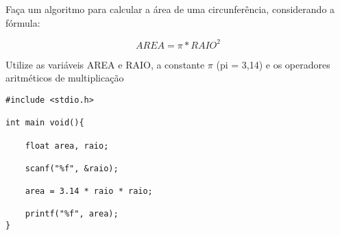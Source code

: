 
Faça um algoritmo para calcular a área de uma circunferência, considerando a fórmula:

\begin{equation}
	AREA = \pi * RAIO^2
\end{equation}

Utilize as variáveis AREA e RAIO, a constante $\pi$ (pi = 3,14) e os operadores aritméticos de multiplicação

\begin{solution}
\begin{lstlisting}
#include <stdio.h>

int main void(){

	float area, raio;
	
	scanf("%f", &raio);
	
	area = 3.14 * raio * raio;
	
	printf("%f", area);
}
\end{lstlisting}
\end{solution}

